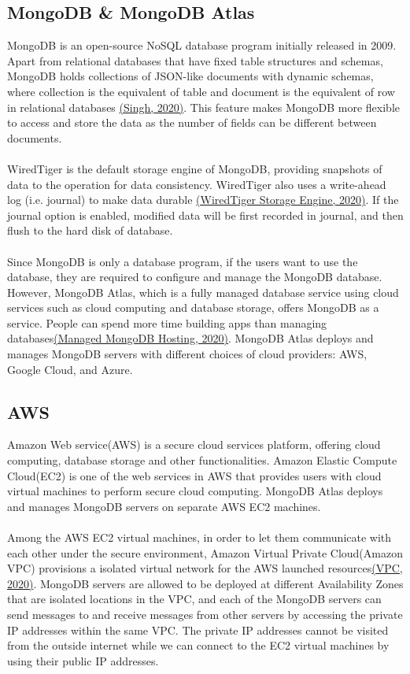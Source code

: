 \documentclass[12pt]{article}
\begin{document}
\subsection{MongoDB \& MongoDB Atlas}
MongoDB is an open-source NoSQL database program initially released in 2009. Apart from relational databases that have fixed table structures and schemas, MongoDB holds collections of JSON-like documents with dynamic schemas, where collection is the equivalent of table and document is the equivalent of row in relational databases \hyperref[sec:reference]{(Singh, 2020)}. This feature makes MongoDB more flexible to access and store the data as the number of fields can be different between documents.\\
\\
WiredTiger is the default storage engine of MongoDB, providing snapshots of data to the operation for data consistency. WiredTiger also uses a write-ahead log (i.e. journal) to make data durable \hyperref[sec:reference]{(WiredTiger Storage Engine, 2020)}. If the journal option is enabled, modified data will be first recorded in journal, and then flush to the hard disk of database. \\
\\
Since MongoDB is only a database program, if the users want to use the database, they are required to configure and manage the MongoDB database. However, MongoDB Atlas, which is a fully managed database service using cloud services such as cloud computing and database storage, offers MongoDB as a service. People can spend more time building apps than managing databases\hyperref[sec:reference]{(Managed MongoDB Hosting, 2020)}. MongoDB Atlas deploys and manages MongoDB servers with different choices of cloud providers: AWS, Google Cloud, and Azure. \\
\subsection{AWS}
Amazon Web service(AWS) is a secure cloud services platform, offering cloud computing, database storage and other functionalities. Amazon Elastic Compute Cloud(EC2) is one of the web services in AWS that provides users with cloud virtual machines to perform secure cloud computing. MongoDB Atlas deploys and manages MongoDB servers on separate AWS EC2 machines.\\
\\
Among the AWS EC2 virtual machines, in order to let them communicate with each other under the secure environment, Amazon Virtual Private Cloud(Amazon VPC) provisions a isolated virtual network for the AWS launched resources\hyperref[sec:reference]{(VPC, 2020)}. MongoDB servers are allowed to be deployed at different Availability Zones that are isolated locations in the VPC, and each of the MongoDB servers can send messages to and receive messages from other servers by accessing the private IP addresses within the same VPC. The private IP addresses cannot be visited from the outside internet while we can connect to the EC2 virtual machines by using their public IP addresses.\\
\end{document}
